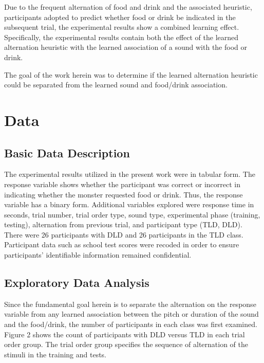 \documentclass[
  letterpaper,
]{report}
\begin{document}
Due to the frequent alternation of food and drink and the associated
heuristic, participants adopted to predict whether food or drink be
indicated in the subsequent trial, the experimental results show a
combined learning effect. Specifically, the experimental results contain
both the effect of the learned alternation heuristic with the learned
association of a sound with the food or drink.

The goal of the work herein was to determine if the learned alternation
heuristic could be separated from the learned sound and food/drink
association.

\hypertarget{data}{%
\section{Data}\label{data}}

\hypertarget{basic-data-description}{%
\subsection{Basic Data Description}\label{basic-data-description}}

The experimental results utilized in the present work were in tabular
form. The response variable shows whether the participant was correct or
incorrect in indicating whether the monster requested food or drink.
Thus, the response variable has a binary form. Additional variables
explored were response time in seconds, trial number, trial order type,
sound type, experimental phase (training, testing), alternation from
previous trial, and participant type (TLD, DLD). There were 26
participants with DLD and 26 participants in the TLD class. Participant
data such as school test scores were recoded in order to ensure
participants' identifiable information remained confidential.

\hypertarget{exploratory-data-analysis}{%
\subsection{Exploratory Data Analysis}\label{exploratory-data-analysis}}

Since the fundamental goal herein is to separate the alternation on the
response variable from any learned association between the pitch or
duration of the sound and the food/drink, the number of participants in
each class was first examined. Figure 2 shows the count of participants
with DLD versus TLD in each trial order group. The trial order group
specifies the sequence of alternation of the stimuli in the training and
tests.
\end{document}
